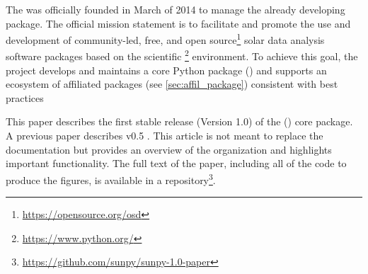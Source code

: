 The \sunpyproj was officially founded in March of 2014 to manage the already developing \sunpypkg package.
The official mission statement is to facilitate and promote the use and development of community-led, free, and open source\footnote{\url{https://opensource.org/osd}} solar data analysis software packages based on the scientific \python\footnote{\url{https://www.python.org/}} environment.
To achieve this goal, the project develops and maintains a core Python package (\sunpypkg) and supports an ecosystem of affiliated packages (see \autoref{sec:affil_package}) consistent with best practices \citep{Wilson:2014cka}

This paper describes the first stable release (Version 1.0) of the (\sunpypkg) core package.
A previous paper describes v0.5 \citep{Community:2015cy}.
This article is not meant to replace the \sunpypkg documentation but provides an overview of the organization and highlights important functionality.
The full text of the paper, including all of the code to produce the figures, is available in a \github repository\footnote{\url{https://github.com/sunpy/sunpy-1.0-paper}}.
